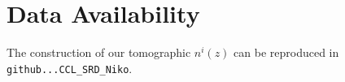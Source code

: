\section*{Data Availability}

 
The construction of our tomographic $n^i(z)$ can be reproduced in {\tt github...CCL\_SRD\_Niko}.